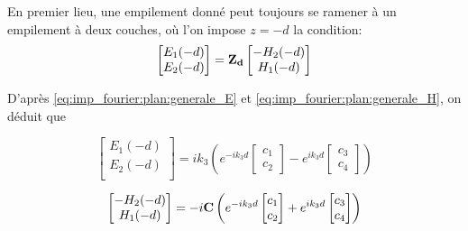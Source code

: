En premier lieu, une empilement donné peut toujours se ramener à un empilement à deux couches, où l'on impose $z=-d$ la condition:
\begin{equation}
    \begin{bmatrix}
        E_1(-d)\\
        E_2(-d)\\
    \end{bmatrix}
    =
    \mathbf{Z_{d}} 
    \begin{bmatrix}
        -H_2(-d)\\
        H_1(-d)\\
    \end{bmatrix}
\end{equation}

D'après \eqref{eq:imp_fourier:plan:generale_E} et \eqref{eq:imp_fourier:plan:generale_H}, on déduit que

\begin{equation}
    \begin{bmatrix}
        E_1(-d)\\
        E_2(-d)\\
    \end{bmatrix}
    = ik_3\left( e^{-ik_3 d}
    \begin{bmatrix}
        c_1 \\
        c_2
    \end{bmatrix}
    -e^{ik_3 d}
    \begin{bmatrix}
        c_3 \\
        c_4
    \end{bmatrix}
    \right)
\end{equation}

\begin{equation}
    \begin{bmatrix}
        -H_2(-d)\\
        H_1(-d)\\
    \end{bmatrix}
    =-i
    \mathbf{C}
    \left(
        e^{-ik_3 d}
        \begin{bmatrix}
            c_1 \\
            c_2
        \end{bmatrix}
        +e^{ik_3 d}
        \begin{bmatrix}
            c_3 \\
            c_4
        \end{bmatrix}
    \right)
\end{equation}

